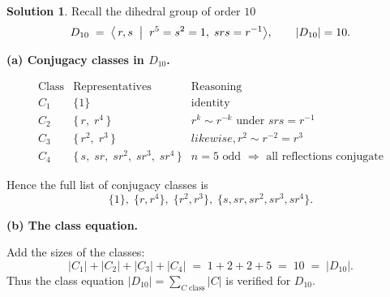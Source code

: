 \documentclass[12pt]{article}
\theoremstyle{definition} %
\newtheorem{solution}{Solution}
\theoremstyle{plain} %
\begin{document}
                    \begin{solution}
                      Recall the dihedral group of order \(10\)
                      \[
                         D_{10}\;=\;
                         \bigl\langle\,r,s \;\bigm|\; r^{5}=s^{2}=1,\; srs=r^{-1}\bigr\rangle,
                      \qquad
                         |D_{10}|=10.
                      \]
                      
                      \bigskip
                      \textbf{(a)  Conjugacy classes in \(D_{10}\).}
                      
                      \[
                      \renewcommand{\arraystretch}{1.2}
                      \begin{array}{c|l|l}
                      \text{Class} & \text{Representatives} & \text{Reasoning}\\\hline
                      C_{1} & \{1\} &
                              \text{identity} \\[2pt]
                      C_{2} & \{\,r,\;r^{4}\,\} &
                              r^{k}\sim r^{-k}\text{ under }srs=r^{-1} \\[2pt]
                      C_{3} & \{\,r^{2},\;r^{3}\,\} &
                              likewise, r^{2}\sim r^{-2}=r^{3} \\[2pt]
                      C_{4} & \{\,s,\;sr,\;sr^{2},\;sr^{3},\;sr^{4}\,\} &
                              n=5\text{ odd }\Longrightarrow\text{ all reflections conjugate}
                      \end{array}
                      \]
                      
                      Hence the full list of conjugacy classes is
                      \[
                         \boxed{
                           \{1\},\;
                           \{r,r^{4}\},\;
                           \{r^{2},r^{3}\},\;
                           \{s,sr,sr^{2},sr^{3},sr^{4}\}.
                         }
                      \]
                      
                      \bigskip
                      \textbf{(b)  The class equation.}
                      
                      Add the sizes of the classes:
                      \[
                         |C_{1}| + |C_{2}| + |C_{3}| + |C_{4}|
                         \;=\; 1 + 2 + 2 + 5
                         \;=\; 10
                         \;=\; |D_{10}|.
                      \]
                      Thus the class equation
                      \(
                         |D_{10}| = \sum_{C\;\text{class}} |C|
                      \)
                      is verified for \(D_{10}\).
                      
                      \end{solution}
\end{document}
